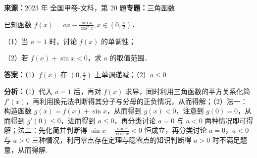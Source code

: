\begin{question}
\textbf{来源：}2023 年 全国甲卷-文科，第 20 题\quad \textbf{专题：}三角函数\par
已知函数 $f(x)=ax-\frac{\sin x}{\cos^2 x}, x\in(0,\frac{\pi}{2})$．

（1）当 $a=1$ 时，讨论 $f(x)$ 的单调性；

（2）若 $f(x)+\sin x<0$，求 $a$ 的取值范围．
\begin{solution}
\textbf{答案：}（1）$f(x)$ 在 $(0,\frac{\pi}{2})$ 上单调递减；（2）$a\le0$

\textbf{分析：}（1）代入 $a=1$ 后，再对 $f(x)$ 求导，同时利用三角函数的平方关系化简 $f'(x)$，再利用换元法判断得其分子与分母的正负情况，从而得解；（2）法一：构造函数 $g(x)=f(x)+\sin x$，从而得到 $g(x)<0$，注意到 $g(0)=0$，从而得到 $g'(0)\le0$，进而得到 $a\le0$，再分类讨论 $a=0$ 与 $a<0$ 两种情况即可得解；法二：先化简并判断得 $\sin x-\frac{\sin x}{\cos^2 x}<0$ 恒成立，再分类讨论 $a=0$，$a<0$ 与 $a>0$ 三种情况，利用零点存在定理与隐零点的知识判断得 $a>0$ 时不满足题意，从而得解.


\end{solution}
\end{question}
